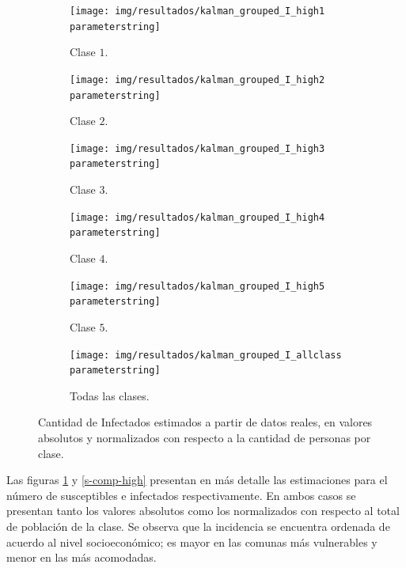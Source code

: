 \begin{figure}[H]
     \centering
     \begin{subfigure}[b]{0.47\textwidth}
         \centering
         \texttt{[image: img/resultados/kalman\_grouped\_I\_high1\\parameterstring]}
         \caption{Clase \(1\).}
     \end{subfigure}
     \hfill
     \begin{subfigure}[b]{.47\textwidth}
         \centering
         \texttt{[image: img/resultados/kalman\_grouped\_I\_high2\\parameterstring]}
         \caption{Clase \(2\).}
     \end{subfigure}
     \hfill
     \begin{subfigure}[b]{.47\textwidth}
         \centering
         \texttt{[image: img/resultados/kalman\_grouped\_I\_high3\\parameterstring]}
         \caption{Clase \(3\).}
     \end{subfigure}
     \hfill
     \begin{subfigure}[b]{.47\textwidth}
         \centering
         \texttt{[image: img/resultados/kalman\_grouped\_I\_high4\\parameterstring]}
         \caption{Clase \(4\).}
     \end{subfigure}
     \hfill
     \begin{subfigure}[b]{.47\textwidth}
         \centering
         \texttt{[image: img/resultados/kalman\_grouped\_I\_high5\\parameterstring]}
         \caption{Clase \(5\).}
     \end{subfigure}
     \hfill
     \begin{subfigure}[b]{.47\textwidth}
         \centering
         \texttt{[image: img/resultados/kalman\_grouped\_I\_allclass\\parameterstring]}
         \caption{Todas las clases.}
     \end{subfigure}
        \caption{Cantidad de Infectados estimados a partir de datos reales, en valores absolutos y normalizados con respecto a la cantidad de personas por clase.}
        \label{e-comp-high}
\end{figure}

Las figuras \ref{e-comp-high} y \ref{s-comp-high} presentan en más detalle las estimaciones para el número de susceptibles e infectados respectivamente. En ambos casos se presentan tanto los valores absolutos como los normalizados con respecto al total de población de la clase. Se observa que la incidencia se encuentra ordenada de acuerdo al nivel socioeconómico; es mayor en las comunas más vulnerables y menor en las más acomodadas.

